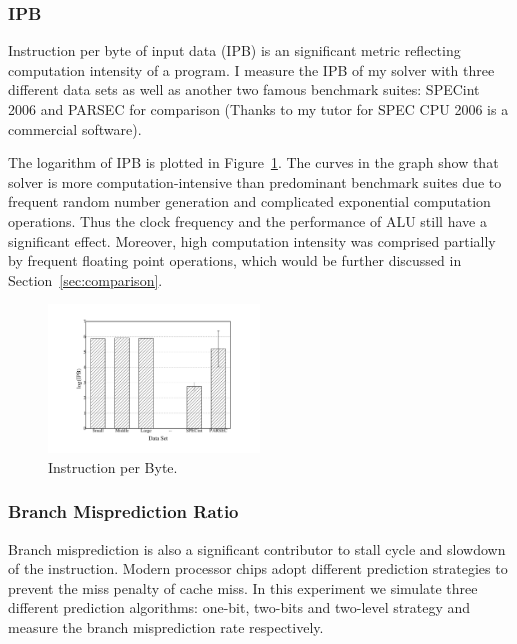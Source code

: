 \subsubsection{IPB}
Instruction per byte of input data (IPB) is an significant metric reflecting computation intensity of a program. I measure the IPB of my solver with three different data sets as well as another two famous benchmark suites: SPECint 2006 and PARSEC for comparison (Thanks to my tutor for SPEC CPU 2006 is a commercial software). 

The logarithm of IPB is plotted in Figure~\ref{fig:IPB}. The curves in the graph show that \SA solver is more computation-intensive than predominant benchmark suites due to frequent random number generation and complicated exponential computation operations. Thus the clock frequency and the performance of ALU still have a significant effect. Moreover, high computation intensity was comprised partially by frequent floating point operations, which would be further discussed in Section~\ref{sec:comparison}.

\begin{figure}
\centering
\includegraphics[width=0.50\textwidth]{graph/IPB.pdf}
\caption{Instruction per Byte.}
\label{fig:IPB}
\end{figure}

\subsubsection{Branch Misprediction Ratio }
Branch misprediction is also a significant contributor to stall cycle and slowdown of the instruction. Modern processor chips adopt different prediction strategies to prevent the miss penalty of cache miss. In this experiment we simulate three different prediction algorithms: one-bit, two-bits and two-level strategy and measure the branch misprediction rate respectively.


